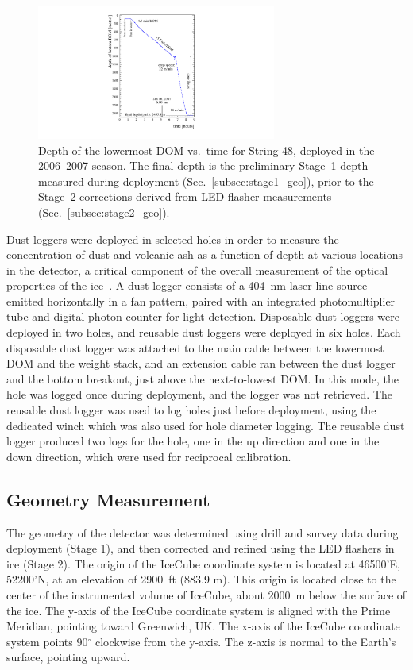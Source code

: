 \begin{figure}[!ht]
 \centering
 \includegraphics[width=0.70\textwidth]{graphics/drill/String48_deploy.pdf}
\caption{Depth of the lowermost DOM vs.~time for String 48, deployed in the
  2006--2007 season. The final depth is the preliminary Stage~1 depth
  measured during deployment (Sec.~\ref{subsec:stage1_geo}),
prior to the Stage~2 corrections derived from LED flasher
measurements (Sec.~\ref{subsec:stage2_geo}).}
\label{fig:deploytime}
\end{figure}

Dust loggers were deployed in selected holes in order to measure the
concentration of dust and volcanic ash as a function of depth at various
locations in the detector, a critical component of the overall measurement
of the optical properties of the
ice~\cite{Aartsen:2013rt,citeulike:2998650}. A dust logger consists of a 404~nm laser line source emitted horizontally in a
fan pattern, paired with an integrated
photomultiplier tube and digital photon counter for light
detection. Disposable dust loggers were deployed in two holes, and reusable dust loggers were
deployed in six holes. Each disposable dust
logger was attached to the main cable between the lowermost DOM and the
weight stack, and an extension cable ran between the dust logger and the
bottom breakout, just above the next-to-lowest DOM. In this mode, the hole
was logged once during deployment, and the logger was not
retrieved. The reusable dust logger was used to
log holes just before deployment, using the dedicated winch which was also used for
hole diameter logging. The reusable dust logger produced two logs for the
hole, one in the up direction and one in the down direction, which were used for
reciprocal calibration.


\subsection{Geometry Measurement}

The geometry of the detector was determined using drill and survey data
during deployment (Stage 1), and then corrected and refined using the LED
flashers in ice (Stage 2). The origin of the IceCube coordinate system
is located at 46500'E, 52200'N, at an elevation of 2900~ft (883.9
m). This origin is located close to the center of the instrumented volume of
IceCube, about 2000~m below the surface of the ice. The y-axis of
the IceCube coordinate system is aligned with the Prime Meridian,
pointing toward Greenwich, UK. The x-axis of the IceCube coordinate
system points 90$^{\circ}$ clockwise from the y-axis. The z-axis is
normal to the Earth's surface, pointing upward. 

